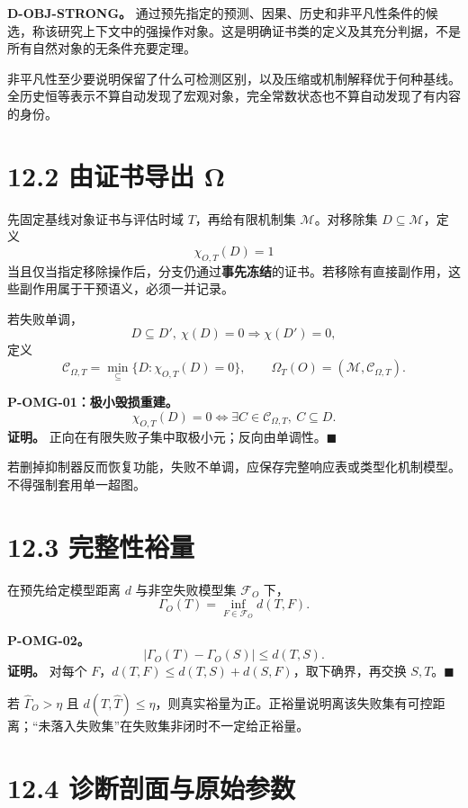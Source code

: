 \documentclass[
  11pt,
  oneside]{book}
\begin{document}
\textbf{D-OBJ-STRONG。} 通过预先指定的预测、因果、历史和非平凡性条件的候选，称该研究上下文中的强操作对象。这是明确证书类的定义及其充分判据，不是所有自然对象的无条件充要定理。

非平凡性至少要说明保留了什么可检测区别，以及压缩或机制解释优于何种基线。全历史恒等表示不算自动发现了宏观对象，完全常数状态也不算自动发现了有内容的身份。

\section{12.2 由证书导出 Ω}\label{ux7531ux8bc1ux4e66ux5bfcux51fa-ux3c9}

先固定基线对象证书与评估时域 \(T\)，再给有限机制集 \(\mathcal M\)。对移除集 \(D\subseteq\mathcal M\)，定义 \[\chi_{O,T}(D)=1\] 当且仅当指定移除操作后，分支仍通过\textbf{事先冻结}的证书。若移除有直接副作用，这些副作用属于干预语义，必须一并记录。

若失败单调， \[D\subseteq D',\ \chi(D)=0\Rightarrow\chi(D')=0,\] 定义 \[\mathcal C_{\Omega,T}=\min_{\subseteq}\{D:\chi_{O,T}(D)=0\},
\qquad
\Omega_T(O)=(\mathcal M,\mathcal C_{\Omega,T}).\]

\hypertarget{p-omg-01}{}\label{p-omg-01}

\textbf{P-OMG-01：极小毁损重建。} \[\chi_{O,T}(D)=0
\iff \exists C\in\mathcal C_{\Omega,T},\ C\subseteq D.\] \textbf{证明。} 正向在有限失败子集中取极小元；反向由单调性。\(\blacksquare\)

若删掉抑制器反而恢复功能，失败不单调，应保存完整响应表或类型化机制模型。不得强制套用单一超图。

\section{12.3 完整性裕量}\label{ux5b8cux6574ux6027ux88d5ux91cf}

在预先给定模型距离 \(d\) 与非空失败模型集 \(\mathcal F_O\) 下， \[\Gamma_O(T)=\inf_{F\in\mathcal F_O}d(T,F).\]

\hypertarget{p-omg-02}{}\label{p-omg-02}

\textbf{P-OMG-02。} \[|\Gamma_O(T)-\Gamma_O(S)|\le d(T,S).\] \textbf{证明。} 对每个 \(F\)，\(d(T,F)\le d(T,S)+d(S,F)\)，取下确界，再交换 \(S,T\)。\(\blacksquare\)

若 \(\widehat\Gamma_O>\eta\) 且 \(d(T,\widehat T)\le\eta\)，则真实裕量为正。正裕量说明离该失败集有可控距离；``未落入失败集''在失败集非闭时不一定给正裕量。

\section{12.4 诊断剖面与原始参数}\label{ux8bcaux65adux5256ux9762ux4e0eux539fux59cbux53c2ux6570}
\end{document}
